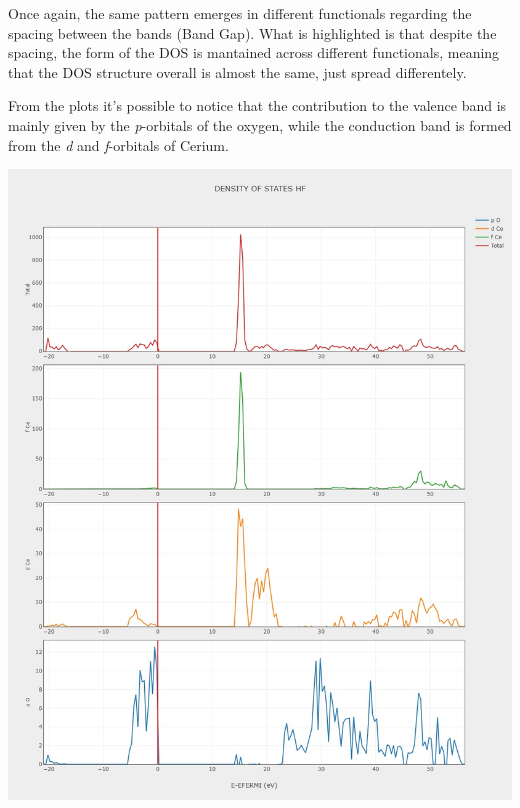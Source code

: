 \documentclass{article}
\begin{document}
Once again, the same pattern emerges in different functionals regarding the spacing between the bands (Band Gap). What is highlighted is that despite the spacing, the form of the DOS is mantained across different functionals, meaning that the DOS structure overall is almost the same, just spread differentely.

From the plots it's possible to notice that the contribution to the valence band is mainly given by the \textit{p}-orbitals of the oxygen, while the conduction band is formed from the \textit{d} and \textit{f}-orbitals of Cerium.

\vspace{15pt}

\noindent\begin{minipage}{0.49\textwidth}
	\centering
	\includegraphics[width=1\textwidth]{../images/correct_band_and_dos/DOSS HF.jpeg}
    \label{fig:DOS_HF}
\end{minipage}
\hfill
\end{document}
